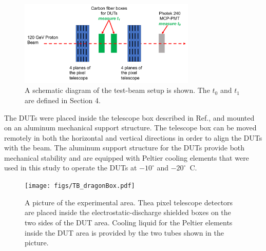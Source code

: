 \documentclass[preprint,1p]{elsarticle}
\begin{document}
\begin{figure}[htbp] 
\centering
\includegraphics[width=0.75\textwidth]{figs/BeamSetup.pdf} 
\caption{A schematic diagram of the test-beam setup is shown. The $t_0$ and $t_1$ are defined in Section 4.} 
\label{fig:DragonBoxDiagram} 
\end{figure} 

The DUTs were placed inside the telescope box described in
Ref.\cite{KWAN2016162}, and mounted on an aluminum mechanical support structure.
The telescope box can be moved remotely in both the horizontal and vertical
directions in order to align the DUTs with the beam. The aluminum support
structure for the DUTs provide both mechanical stability and are
equipped with Peltier cooling elements that were used in this study to operate
the DUTs at $-10^{\circ}$ and $-20^{\circ}$~C.

\begin{figure}[htbp] 
\centering
\texttt{[image: figs/TB\_dragonBox.pdf]} 
\caption{A picture of the experimental area. Thea pixel telescope detectors are placed inside the 
electrostatic-discharge shielded boxes on the two sides of the DUT area. Cooling liquid for 
the Peltier elements inside the DUT area is provided by the two tubes shown in the picture.} 
\label{fig:DragonBox} 
\end{figure} 
\end{document}
